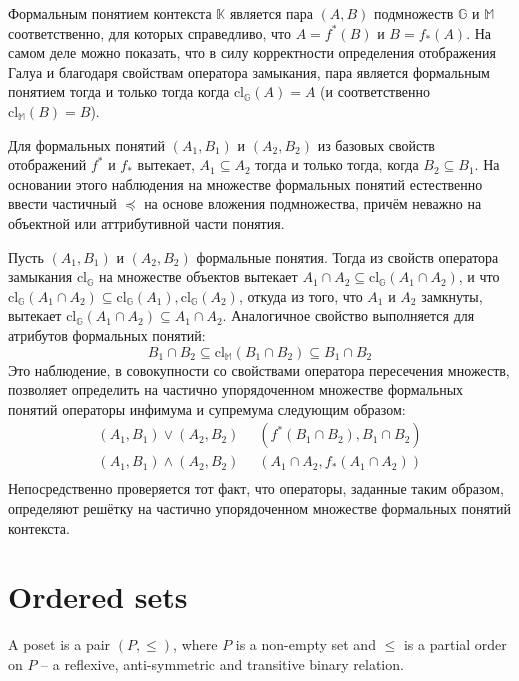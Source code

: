 \documentclass[a4paper]{article}
\newcommand{\brac}[1]{{\left ( #1 \right )}}
\newcommand{\Ctx}{\mathbb{K}}
\newcommand{\defn}{\mathop{\overset{\Delta}{=}}\nolimits}
\begin{document}
Формальным понятием контекста $\Ctx$ является пара $(A,B)$ подмножеств $\mathbb{G}$ и $\mathbb{M}$ соответственно, для которых справедливо, что $A=f^*\brac{B}$ и $B=f_*\brac{A}$. На самом деле можно показать, что в силу корректности определения отображения Галуа и благодаря свойствам оператора замыкания, пара является формальным понятием тогда и только тогда когда $\text{cl}_{\mathbb{G}}\brac{A} = A$ (и соответственно $\text{cl}_{\mathbb{M}}\brac{B} = B$).

Для формальных понятий $(A_1,B_1)$ и $(A_2,B_2)$ из базовых свойств отображений $f^*$ и $f_*$ вытекает, $A_1\subseteq A_2$ тогда и только тогда, когда $B_2\subseteq B_1$. На основании этого наблюдения на множестве формальных понятий естественно ввести частичный $\preceq$ на основе вложения подмножества, причём неважно на объектной или аттрибутивной части понятия. 

Пусть $(A_1,B_1)$ и $(A_2,B_2)$ формальные понятия. Тогда из свойств оператора замыкания $\text{cl}_{\mathbb{G}}$ на множестве объектов вытекает $A_1\cap A_2\subseteq \text{cl}_{\mathbb{G}}\brac{A_1\cap A_2}$, и что $\text{cl}_{\mathbb{G}}\brac{A_1\cap A_2}\subseteq \text{cl}_{\mathbb{G}}\brac{A_1}, \text{cl}_{\mathbb{G}}\brac{A_2}$, откуда из того, что $A_1$ и $A_2$ замкнуты, вытекает $\text{cl}_{\mathbb{G}}\brac{A_1\cap A_2}\subseteq A_1\cap A_2$. Аналогичное свойство выполняется для атрибутов формальных понятий: \[B_1\cap B_2 \subseteq \text{cl}_{\mathbb{M}}\brac{B_1\cap B_2} \subseteq B_1\cap B_2\] Это наблюдение, в совокупности со свойствами оператора пересечения множеств, позволяет определить на частично упорядоченном множестве формальных понятий операторы инфимума и супремума следующим образом: \begin{align*}
	\brac{A_1, B_1}\vee \brac{A_2, B_2} &\defn \brac{f^*\brac{B_1\cap B_2}, B_1\cap B_2}\\
	\brac{A_1, B_1}\wedge \brac{A_2, B_2} &\defn \brac{A_1\cap A_2, f_*\brac{A_1\cap A_2}}\\
\end{align*}
Непосредственно проверяется тот факт, что операторы, заданные таким образом, определяют решётку на частично упорядоченном множестве формальных понятий контекста.

\section{Ordered sets} %
\label{sec:ordered_sets}

A poset is a pair $(P,\leq)$, where $P$ is a non-empty set and $\leq$ is a partial order on $P$ -- a reflexive, anti-symmetric and transitive binary relation.
\end{document}
